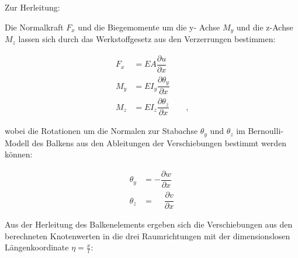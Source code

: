 \documentclass[11pt,titlepage,listof=totoc,bibliography=totoc,twoside]{scrreprt}
\begin{document}

Zur Herleitung:

Die Normalkraft $F_x$ und die Biegemomente um die y- Achse $M_y$ und die z-Achse $M_z$ lassen sich durch das Werkstoffgesetz aus den Verzerrungen bestimmen:

\begin{align}
F_x	&=	EA\dfrac{\partial u}{\partial x}	\\
M_y	&=	EI_y\dfrac{\partial \theta_y}{\partial x}	\\
M_z	&=	EI_z\dfrac{\partial \theta_z}{\partial x}	\qquad\mbox{,}
\end{align}

wobei die Rotationen um die Normalen zur Stabachse $\theta_y$ und $\theta_z$ im Bernoulli-Modell des Balkens aus den Ableitungen der Verschiebungen bestimmt werden können:

\begin{align}
\theta_y	&=	-\dfrac{\partial w}{\partial x}	\\
\theta_z	&=	\phantom{-}\dfrac{\partial v}{\partial x}
\end{align}

Aus der Herleitung des Balkenelements ergeben sich die Verschiebungen aus den berechneten Knotenwerten in die drei Raumrichtungen mit der dimensionslosen Längenkoordinate $\eta=\frac{x}{l}$:
\end{document}
